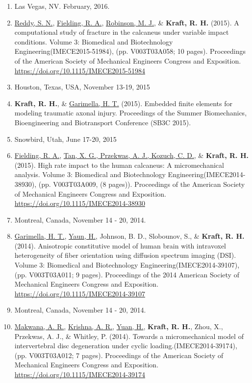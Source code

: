 \documentclass[a4paper,10pt]{article}
\begin{document}
\begin{enumerate}
  \item Las Vegas, NV. February, 2016.
  \item \underline{Reddy, S. N.}, \underline{Fielding, R. A.}, \underline{Robinson, M. J.}, \&
 \textbf{\textbf{Kraft,} R. H.} (2015). A computational study of fracture in the calcaneus under variable impact conditions. Volume 3: Biomedical and Biotechnology Engineering(IMECE2015-51984), (pp. V003T03A058; 10 pages). Proceedings of the American Society of Mechanical Engineers Congress and Exposition. \url{https://doi.org/10.1115/IMECE2015-51984}
  \item Houston, Texas, USA, November 13-19, 2015
  \item \textbf{\textbf{Kraft,} R. H.}, \&
 \underline{Garimella, H. T.} (2015). Embedded finite elements for modeling traumatic axonal injury. Proceedings of the Summer Biomechanics, Bioengineering and Biotransport Conference    (SB3C 2015).
  \item Snowbird, Utah, June 17-20, 2015
  \item \underline{Fielding, R. A.}, \underline{Tan, X. G., Przekwas, A. J., Kozuch, C. D.}, \&
 \textbf{\textbf{Kraft,} R. H.} (2015). High rate impact to the human calcaneus: A micromechanical analysis. Volume 3: Biomedical and Biotechnology Engineering(IMECE2014-38930), (pp. V003T03A009, (8 pages)). Proceedings of the American Society of Mechanical Engineers Congress and Exposition. \url{https://doi.org/10.1115/IMECE2014-38930}
  \item Montreal, Canada, November 14 - 20, 2014.
  \item \underline{Garimella, H. T.}, \underline{Yaun, H.}, Johnson, B. D., Slobounov, S., \&
 \textbf{\textbf{Kraft,} R. H.} (2014). Anisotropic constitutive model of human brain with intravoxel heterogeneity of fiber orientation using diffusion spectrum imaging (DSI). Volume 3: Biomedical and Biotechnology Engineering(IMECE2014-39107), (pp. V003T03A011; 9 pages). Proceedings of the 2014 American Society of Mechanical Engineers Congress and Exposition. \url{https://doi.org/10.1115/IMECE2014-39107}
  \item Montreal, Canada, November 14 - 20, 2014.
  \item \underline{Makwana, A. R.}, \underline{Krishna, A. R.}, \underline{Yuan, H.}, \textbf{\textbf{Kraft,} R. H.}, Zhou, X., Przekwas, A. J., \&
 Whitley, P. (2014). Towards a micromechanical model of intervertebral disc degeneration under cyclic loading.(IMECE2014-39174), (pp. V003T03A012; 7 pages). Proceedings of the American Society of Mechanical Engineers Congress and Exposition. \url{https://doi.org/10.1115/IMECE2014-39174}

\end{enumerate}
\end{document}
